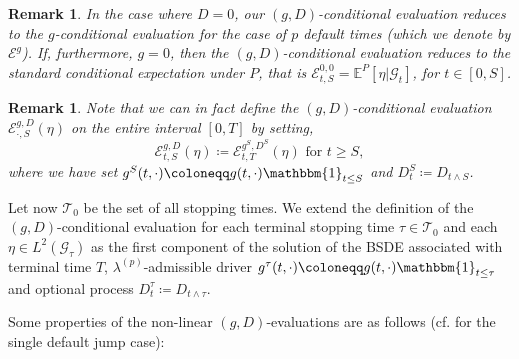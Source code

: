 \documentclass[11pt,a4paper]{article}
\numberwithin{equation}{section}
\theoremstyle{newPlain}
\theoremstyle{newDefinition}
\theoremstyle{newRemark}
\newtheorem{remark}[theorem]{Remark}
\begin{document}
\begin{remark}
    In the case where $D=0$, our $(g,D)$-conditional evaluation reduces to the $g$-conditional evaluation for the case of $p$ default times (which we denote by  $\mathscr{E}^g$).
    If, furthermore,  $g=0$, then the $(g,D)$-conditional evaluation reduces to the standard conditional expectation under $P$, that is $\mathscr{E}_{t,S}^{0,0}=\mathbb{E}^P[\eta|\mathcal{G}_t]$, for $t\in[0,S]$.
\end{remark}

\begin{remark}
    Note that we can in fact define the $(g,D)$-conditional evaluation $\mathscr{E}_{\cdot,S}^{g,D}(\eta)$ on the entire interval $[0,T]$ by setting,
    \begin{equation*}
        \mathscr{E}_{t,S}^{g,D}(\eta)\coloneqq\mathscr{E}_{t,T}^{g^S,D^S}(\eta)\text{ for }t\ge S,
    \end{equation*}
where we have set $g^S(t,\cdot)\coloneqq g(t,\cdot)\mathbbm{1}_{t\le S}$ and $D_t^S\coloneqq D_{t\wedge S}$.
\end{remark}

Let now $\mathcal{T}_0$ be the set of all stopping times. We extend the definition of the $(g,D)$-conditional evaluation for each terminal stopping time $\tau\in\mathcal{T}_0$ and each $\eta\in L^2(\mathcal{G}_\tau)$ as the first component of the solution of the BSDE associated with  terminal time $T$, $\lambda^{(p)}$-admissible driver $g^\tau(t,\cdot)\coloneqq g(t,\cdot)\mathbbm{1}_{t\le \tau}$ and optional process $D_t^\tau\coloneqq D_{t\wedge\tau}$.

Some properties of the non-linear $(g,D)$-evaluations are as follows (cf.  \cite{dumitrescu2018bsdes} for the single default jump case):   
\end{document}

